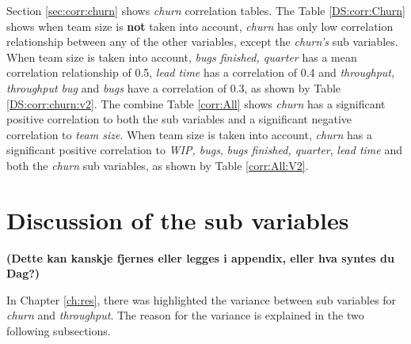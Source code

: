 \documentclass[UKenglish]{ifimaster}  %
\begin{document}

Section \ref{sec:corr:churn} shows \textit{churn} correlation tables. The Table \ref{DS:corr:Churn} shows when team size is \textbf{not} taken into account, \textit{churn} has only low correlation relationship between any of the other variables, except the \textit{churn's} sub variables. When  team size is taken into account, \textit{bugs finished, quarter} has a mean correlation relationship of 0.5, \textit{lead time} has a correlation of 0.4 and \textit{throughput, throughput bug} and \textit{bugs} have a correlation of 0.3, as shown by Table \ref{DS:corr:churn:v2}. The combine Table \ref{corr:All} shows \textit{churn} has a significant positive correlation  to both the sub variables and a significant negative correlation to \textit{team size}. When team size is taken into account, \textit{churn} has a significant positive correlation to \textit{WIP, bugs}, \textit{bugs finished, quarter}, \textit{lead time} and  both the \textit{churn} sub variables, as shown by Table \ref{corr:All:V2}. 






\section{Discussion of the sub variables}
\textbf{(Dette kan kanskje fjernes eller legges i appendix, eller hva syntes du Dag?)}

In Chapter \ref{ch:res}, there was highlighted the variance between sub variables for \textit{churn} and \textit{throughput}. The reason for the variance is explained in the two following subsections.
\label{sec:diss:sv}
\end{document}
